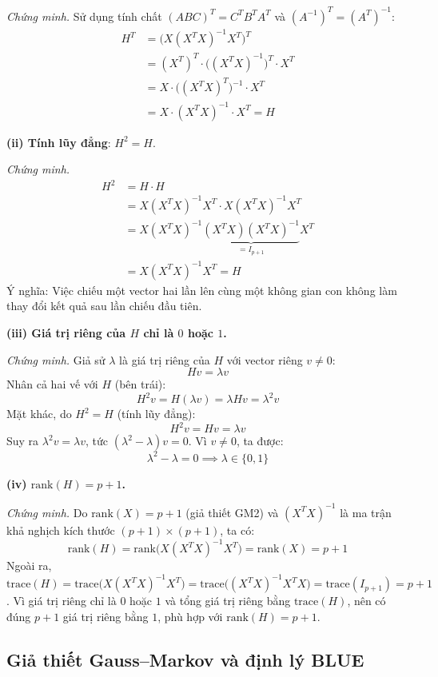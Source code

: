 \documentclass[a4paper]{article}
\begin{document}
\textit{Chứng minh.} Sử dụng tính chất $(ABC)^T = C^TB^TA^T$ và $(A^{-1})^T = (A^T)^{-1}$:
\begin{align*}
H^T &= \bigl(X(X^TX)^{-1}X^T\bigr)^T \\
     &= (X^T)^T \cdot \bigl((X^TX)^{-1}\bigr)^T \cdot X^T \\
     &= X \cdot \bigl((X^TX)^T\bigr)^{-1} \cdot X^T \\
     &= X \cdot (X^TX)^{-1} \cdot X^T = H
\end{align*}

\textbf{(ii) Tính lũy đẳng}: \textbf{$H^2 = H$}.

\textit{Chứng minh.}
\begin{align*}
H^2 &= H \cdot H \\
     &= X(X^TX)^{-1}X^T \cdot X(X^TX)^{-1}X^T \\
     &= X(X^TX)^{-1} \underbrace{(X^TX)(X^TX)^{-1}}_{= I_{p+1}} X^T \\
     &= X(X^TX)^{-1}X^T = H
\end{align*}
Ý nghĩa: Việc chiếu một vector hai lần lên cùng một không gian con không làm thay đổi kết quả sau lần chiếu đầu tiên.

\textbf{(iii) Giá trị riêng của $H$ chỉ là $0$ hoặc $1$.}

\textit{Chứng minh.} Giả sử $\lambda$ là giá trị riêng của $H$ với vector riêng $v \neq 0$:
\[Hv = \lambda v\]
Nhân cả hai vế với $H$ (bên trái):
\[H^2 v = H(\lambda v) = \lambda Hv = \lambda^2 v\]
Mặt khác, do $H^2 = H$ (tính lũy đẳng):
\[H^2 v = Hv = \lambda v\]
Suy ra $\lambda^2 v = \lambda v$, tức $(\lambda^2 - \lambda)v = 0$. Vì $v \neq 0$, ta được:
\[\lambda^2 - \lambda = 0 \implies \lambda \in \{0, 1\}\]

\textbf{(iv) $\text{rank}(H) = p + 1$.}

\textit{Chứng minh.} Do $\text{rank}(X) = p + 1$ (giả thiết GM2) và $(X^TX)^{-1}$ là ma trận khả nghịch kích thước $(p+1)\times(p+1)$, ta có:
\[\text{rank}(H) = \text{rank}\bigl(X(X^TX)^{-1}X^T\bigr) = \text{rank}(X) = p + 1\]
Ngoài ra, $\text{trace}(H) = \text{trace}\bigl(X(X^TX)^{-1}X^T\bigr) = \text{trace}\bigl((X^TX)^{-1}X^TX\bigr) = \text{trace}(I_{p+1}) = p + 1$. Vì giá trị riêng chỉ là $0$ hoặc $1$ và tổng giá trị riêng bằng $\text{trace}(H)$, nên có đúng $p+1$ giá trị riêng bằng $1$, phù hợp với $\text{rank}(H) = p+1$. 

\subsection{Giả thiết Gauss--Markov và định lý BLUE}
\end{document}
